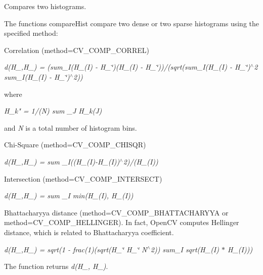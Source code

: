 Compares two histograms.

The functions {\ttfamily compare\+Hist} compare two dense or two sparse histograms using the specified method\+:


\begin{DoxyItemize}
\item Correlation ({\ttfamily method=C\+V\+\_\+\+C\+O\+M\+P\+\_\+\+C\+O\+R\+R\+EL}) 
\end{DoxyItemize}

{\itshape d(\+H\+\_,\+H\+\_) = (sum\+\_\+I(H\+\_(\+I) -\/ H\+\_\char`\"{})(\+H\+\_(\+I) -\/ H\+\_\char`\"{}))/(sqrt(sum\+\_\+I(H\+\_(\+I) -\/ H\+\_\char`\"{})$^\wedge$2 sum\+\_\+\+I(\+H\+\_(\+I) -\/ H\+\_\char`\"{})$^\wedge$2))}

where

{\itshape H\+\_\+k" = 1/(N) sum \+\_\+J H\+\_\+k(\+J)}

and {\itshape N} is a total number of histogram bins.


\begin{DoxyItemize}
\item Chi-\/\+Square ({\ttfamily method=C\+V\+\_\+\+C\+O\+M\+P\+\_\+\+C\+H\+I\+S\+QR}) 
\end{DoxyItemize}

{\itshape d(\+H\+\_,\+H\+\_) = sum \+\_\+I((H\+\_(\+I)-\/\+H\+\_(I))$^\wedge$2)/(H\+\_(\+I))}


\begin{DoxyItemize}
\item Intersection ({\ttfamily method=C\+V\+\_\+\+C\+O\+M\+P\+\_\+\+I\+N\+T\+E\+R\+S\+E\+CT}) 
\end{DoxyItemize}

{\itshape d(\+H\+\_,\+H\+\_) = sum \+\_\+I min(H\+\_(\+I), H\+\_(\+I))}


\begin{DoxyItemize}
\item Bhattacharyya distance ({\ttfamily method=C\+V\+\_\+\+C\+O\+M\+P\+\_\+\+B\+H\+A\+T\+T\+A\+C\+H\+A\+R\+Y\+YA} or {\ttfamily method=C\+V\+\_\+\+C\+O\+M\+P\+\_\+\+H\+E\+L\+L\+I\+N\+G\+ER}). In fact, Open\+CV computes Hellinger distance, which is related to Bhattacharyya coefficient. 
\end{DoxyItemize}

{\itshape d(\+H\+\_,\+H\+\_) = sqrt(1 -\/ frac(1)(sqrt(H\+\_\char`\"{} H\+\_\char`\"{} N$^\wedge$2)) sum\+\_\+I sqrt(H\+\_(\+I) $\ast$ H\+\_(\+I)))}

The function returns {\itshape d(\+H\+\_, H\+\_)}.

